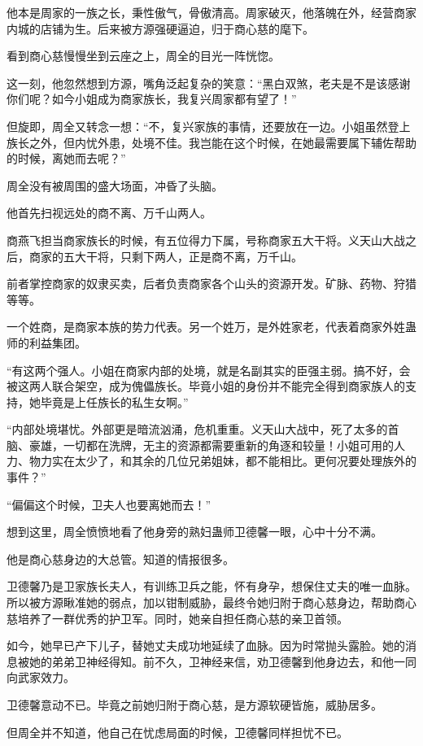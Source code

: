 \begin{this_body}
他本是周家的一族之长，秉性傲气，骨傲清高。周家破灭，他落魄在外，经营商家内城的店铺为生。后来被方源强硬逼迫，归于商心慈的麾下。

看到商心慈慢慢坐到云座之上，周全的目光一阵恍惚。

这一刻，他忽然想到方源，嘴角泛起复杂的笑意：“黑白双煞，老夫是不是该感谢你们呢？如今小姐成为商家族长，我复兴周家都有望了！”

但旋即，周全又转念一想：“不，复兴家族的事情，还要放在一边。小姐虽然登上族长之外，但内忧外患，处境不佳。我岂能在这个时候，在她最需要属下辅佐帮助的时候，离她而去呢？”

周全没有被周围的盛大场面，冲昏了头脑。

他首先扫视远处的商不离、万千山两人。

商燕飞担当商家族长的时候，有五位得力下属，号称商家五大干将。义天山大战之后，商家的五大干将，只剩下两人，正是商不离，万千山。

前者掌控商家的奴隶买卖，后者负责商家各个山头的资源开发。矿脉、药物、狩猎等等。

一个姓商，是商家本族的势力代表。另一个姓万，是外姓家老，代表着商家外姓蛊师的利益集团。

“有这两个强人。小姐在商家内部的处境，就是名副其实的臣强主弱。搞不好，会被这两人联合架空，成为傀儡族长。毕竟小姐的身份并不能完全得到商家族人的支持，她毕竟是上任族长的私生女啊。”

“内部处境堪忧。外部更是暗流汹涌，危机重重。义天山大战中，死了太多的首脑、豪雄，一切都在洗牌，无主的资源都需要重新的角逐和较量！小姐可用的人力、物力实在太少了，和其余的几位兄弟姐妹，都不能相比。更何况要处理族外的事件？”

“偏偏这个时候，卫夫人也要离她而去！”

想到这里，周全愤愤地看了他身旁的熟妇蛊师卫德馨一眼，心中十分不满。

他是商心慈身边的大总管。知道的情报很多。

卫德馨乃是卫家族长夫人，有训练卫兵之能，怀有身孕，想保住丈夫的唯一血脉。所以被方源瞅准她的弱点，加以钳制威胁，最终令她归附于商心慈身边，帮助商心慈培养了一群优秀的护卫军。同时，她亲自担任商心慈的亲卫首领。

如今，她早已产下儿子，替她丈夫成功地延续了血脉。因为时常抛头露脸。她的消息被她的弟弟卫神经得知。前不久，卫神经来信，劝卫德馨到他身边去，和他一同向武家效力。

卫德馨意动不已。毕竟之前她归附于商心慈，是方源软硬皆施，威胁居多。

但周全并不知道，他自己在忧虑局面的时候，卫德馨同样担忧不已。


\end{this_body}
